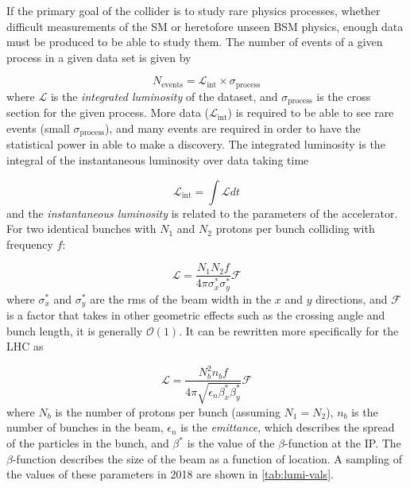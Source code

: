 If the primary goal of the collider is to study rare physics processes, whether difficult measurements of the \ac{SM} or heretofore unseen \ac{BSM} physics, enough data must be produced to be able to study them. The number of events of a given process in a given data set is given by

\begin{equation}
N_{\textrm{events}} = \mathcal{L}_{\textrm{int}} \times \sigma_{\textrm{process}}
\label{eq:nevents_lumi}
\end{equation}
where $\mathcal{L}$ is the \emph{integrated luminosity} of the dataset, and $\sigma_{\textrm{process}}$ is the cross section for the given process. More data ($\mathcal{L}_{\textrm{int}}$) is required to be able to see rare events (small $\sigma_{\textrm{process}}$), and many events are required in order to have the statistical power in able to make a discovery. The integrated luminosity is the integral of the instantaneous luminosity over data taking time

\begin{equation}
\mathcal{L}_{\textrm{int}} = \int \mathcal{L} dt
\end{equation}
and the \emph{instantaneous luminosity} is related to the parameters of the accelerator. For two identical bunches with $N_1$ and $N_2$ protons per bunch colliding with frequency $f$:

\begin{equation}
\mathcal{L} = \frac{N_1 N_2 f}{4\pi \sigma_x^* \sigma_y^*} \mathcal{F}
\end{equation}
where $\sigma_x^*$ and  $\sigma_y^*$ are the \ac{rms} of the beam width in the $x$ and $y$ directions, and $\mathcal{F}$ is a factor that takes in other geometric effects such as the crossing angle and bunch length, it is generally $\mathcal{O}(1)$. It can be rewritten more specifically for the \ac{LHC} as

\begin{equation}
\mathcal{L} = \frac{N_b^2 n_b f }{4\pi \sqrt{\epsilon_n \beta^*_x \beta^*_y}}\mathcal{F}
\end{equation}
where $N_b$ is the number of protons per bunch (assuming $N_1 = N_2$), $n_b$ is the number of bunches in the beam, $\epsilon_n$ is the \emph{emittance}, which describes the spread of the particles in the bunch, and $\beta^*$ is the value of the $\beta$-function at the \ac{IP}. The $\beta$-function describes the size of the beam as a function of location. A sampling of the values of these parameters in 2018 are shown in \autoref{tab:lumi-vals}.



